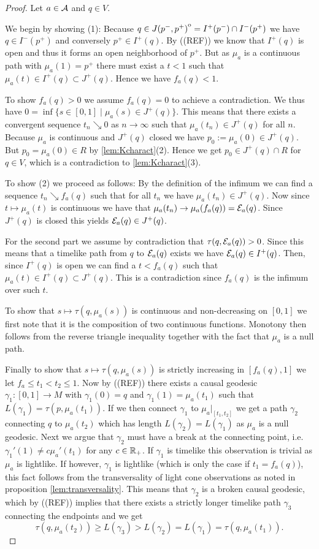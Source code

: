 \begin{proof}
Let $a\in {\mathcal{A}}$ and $q\in V$.

We begin by showing (1): 
Because $q \in {\kern0ptJ(p^-,p^+)}^{\mathrm{o}} = I^+(p^-)\cap I^-(p^+)$ we have $q\in I^-(p^+)$ and conversely $p^+\in I^+(q)$. By ((REF)) we know that $I^+(q)$ is open and thus it forms an open neighborhood of $p^+$. But as $\mu_a$ is a continuous path with $\mu_a(1)=p^+$ there must exist a $t<1$ such that $\mu_a(t)\in I^+(q)\subset J^+(q)$. Hence we have $f_a(q)<1$.

To show $f_a(q)>0$ we assume $f_a(q)=0$ to achieve a contradiction. We thus have $0=\inf \{s\in [0,1] \mid \mu_a(s)\in J^+(q)\}$. This means that there exists a convergent sequence $t_n\searrow 0$ as $n\to \infty$ such that $\mu_a(t_n)\in J^+(q)$ for all $n$. Because $\mu_a$ is continuous and $J^+(q)$ closed we have $p_0:=\mu_a(0)\in J^+(q)$. But $p_0=\mu_a(0)\in R$ by \ref{lem:Kcharact}(2). Hence we get $p_0\in J^+(q) \cap R$ for $q\in V$, which is a contradiction to \ref{lem:Kcharact}(3).

To show (2) we proceed as follows:
By the definition of the infimum we can find a sequence $t_n\searrow f_a(q)$ such that for all $t_n$ we have $\mu_a(t_n)\in J^+(q)$. Now since $t\mapsto \mu_a(t)$ is continuous we have that $\mu_a(t_n)\to \mu_a(f_a(q)) = {\mathcal{E}}_a(q)$. Since $J^+(q)$ is closed this yields ${\mathcal{E}}_a(q)\in J^+(q)$. 

For the second part we assume by contradiction that $\tau(q,{\mathcal{E}}_a(q)) > 0$. Since this means that a timelike path from $q$ to ${\mathcal{E}}_a(q)$ exists we have ${\mathcal{E}}_a(q)\in I^+(q)$. Then, since $I^+(q)$ is open we can find a $t<f_a(q)$ such that $\mu_a(t)\in I^+(q) \subset J^+(q)$. This is a contradiction since $f_a(q)$ is the infimum over such $t$.

To show that $s\mapsto \tau(q,\mu_a(s))$ is continuous and non-decreasing on $[0,1]$ we first note that it is the composition of two continuous functions. Monotony then follows from the reverse triangle inequality together with the fact that $\mu_a$ is a null path.

Finally to show that $s\mapsto \tau(q,\mu_a(s))$ is strictly increasing in $[f_a(q),1]$ we let $f_a\leq t_1<t_2\leq 1$. Now by ((REF)) there exists a causal geodesic $\gamma_1:[0,1]\to M$ with $\gamma_1(0)=q$ and $\gamma_1(1)=\mu_a(t_1)$ such that $L(\gamma_1)=\tau(p,\mu_a(t_1))$. 
If we then connect $\gamma_1$ to $\mu_a\rvert_{[t_1,t_2]}$ we get a path $\gamma_2$ connecting $q$ to $\mu_a(t_2)$ which has length $L(\gamma_2) = L(\gamma_1)$ as $\mu_a$ is a null geodesic. Next we argue that $\gamma_2$ must have a break at the connecting point, i.e. $\gamma_1'(1) \neq c\mu_a'(t_1)$ for any $c\in \mathbb{R}_+$. If $\gamma_1$ is timelike this observation is trivial as $\mu_a$ is lightlike. If however, $\gamma_1$ is lightlike (which is only the case if $t_1=f_a(q)$), this fact follows from the transversality of light cone observations as noted in proposition \ref{lem:transversality}. This means that $\gamma_2$ is a broken causal geodesic, which by ((REF)) implies that there exists a strictly longer timelike path $\gamma_3$ connecting the endpoints and we get
\[
\tau(q,\mu_a(t_2)) \geq L(\gamma_3) > L(\gamma_2) = L(\gamma_1) = \tau(q,\mu_a(t_1)).
\]


\end{proof}
